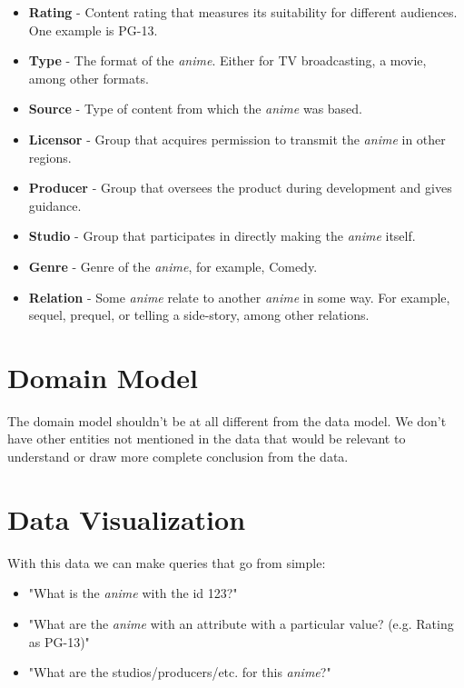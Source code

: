 \documentclass[twocolumn,twoside,11pt,a4paper]{article}
\begin{document}
\begin{itemize}
\item \textbf{Rating} - Content rating that measures its suitability for different audiences. One example is PG-13.
\item \textbf{Type} - The format of the \textit{anime}. Either for TV broadcasting, a movie, among other formats.
\item \textbf{Source} - Type of content from which the \textit{anime} was based.
\item \textbf{Licensor} - Group that acquires permission to transmit the \textit{anime} in other regions.
\item \textbf{Producer} - Group that oversees the product during development and gives guidance.
\item \textbf{Studio} - Group that participates in directly making the \textit{anime} itself.
\item \textbf{Genre} - Genre of the \textit{anime}, for example, Comedy.
\item \textbf{Relation} - Some \textit{anime} relate to another \textit{anime} in some way. For example, sequel, prequel, or telling a side-story, among other relations.
\end{itemize}

\section{Domain Model} \label{domain}
The domain model shouldn't be at all different from the data model. We don't have other entities not mentioned in the data that would be relevant to understand or draw more complete conclusion from the data.

\section{Data Visualization}  \label{visualization}
With this data we can make queries that go from simple:
\begin{itemize}
\item "What is the \textit{anime} with the id 123?"
\item"What are the \textit{anime} with an attribute with a particular value? (e.g. Rating as PG-13)"
\item "What are the studios/producers/etc. for this \textit{anime}?"
\end{itemize}
\end{document}
